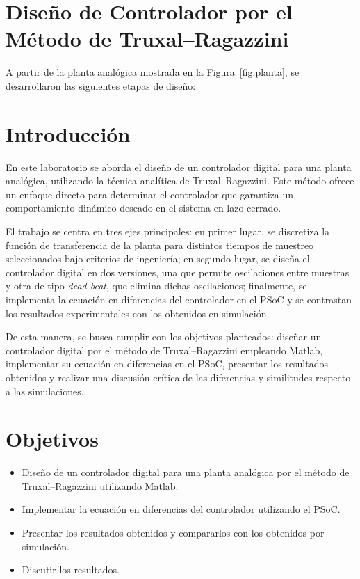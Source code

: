 \section{Diseño de Controlador por el Método de Truxal--Ragazzini}

A partir de la planta analógica mostrada en la Figura~\ref{fig:planta}, se desarrollaron las siguientes etapas de diseño:


\section{Introducción}

 En este laboratorio se aborda el diseño de un controlador digital para una planta analógica, utilizando la técnica analítica de Truxal--Ragazzini. Este método ofrece un enfoque directo para determinar el controlador que garantiza un comportamiento dinámico deseado en el sistema en lazo cerrado.

El trabajo se centra en tres ejes principales: en primer lugar, se discretiza la función de transferencia de la planta para distintos tiempos de muestreo seleccionados bajo criterios de ingeniería; en segundo lugar, se diseña el controlador digital en dos versiones, una que permite oscilaciones entre muestras y otra de tipo \emph{dead-beat}, que elimina dichas oscilaciones; finalmente, se implementa la ecuación en diferencias del controlador en el PSoC y se contrastan los resultados experimentales con los obtenidos en simulación.

De esta manera, se busca cumplir con los objetivos planteados: diseñar un controlador digital por el método de Truxal--Ragazzini empleando Matlab, implementar su ecuación en diferencias en el PSoC, presentar los resultados obtenidos y realizar una discusión crítica de las diferencias y similitudes respecto a las simulaciones.



\section{Objetivos}
\begin{itemize}
	\item Diseño de un controlador digital para una planta analógica por el método de Truxal--Ragazzini utilizando Matlab.
	\item Implementar la ecuación en diferencias del controlador utilizando el PSoC.
	\item Presentar los resultados obtenidos y compararlos con los obtenidos por simulación.
	\item Discutir los resultados. 
\end{itemize}


